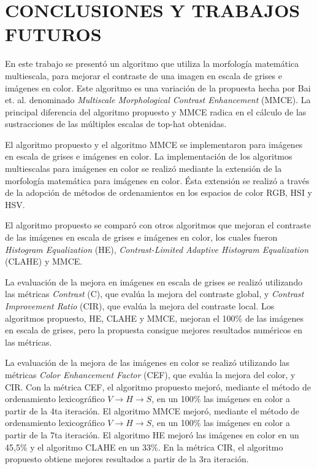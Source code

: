 \chapter{CONCLUSIONES Y TRABAJOS\\ FUTUROS}
\label{sec:conclusion}

En este trabajo se presentó un algoritmo que utiliza la morfología matemática multiescala, para mejorar el contraste de una imagen en escala de grises e imágenes en color. Este algoritmo es una variación de la propuesta hecha por Bai et. al. \cite{bai2012image} denominado \textit{Multiscale Morphological Contrast Enhancement} (MMCE). La principal diferencia del algoritmo propuesto y MMCE radica en el cálculo de las sustracciones de las múltiples escalas de top-hat obtenidas.


El algoritmo propuesto y el algoritmo MMCE se implementaron para imágenes en escala de grises e imágenes en color. La implementación de los algoritmos multiescalas para imágenes en color se realizó mediante la extensión de la morfología matemática para imágenes en color. Ésta extensión se realizó a través de la adopción de métodos de ordenamientos en los espacios de color RGB, HSI y HSV.

El algoritmo propuesto se comparó con otros algoritmos que mejoran el contraste de las imágenes en escala de grises e imágenes en color, los cuales fueron \textit{Histogram Equalization} (HE), \textit{Contrast-Limited Adaptive Histogram Equalization} (CLAHE) y MMCE. %

La evaluación de la mejora en imágenes en escala de grises se realizó utilizando las métricas \textit{Contrast} (C), que evalúa la mejora del contraste global, y \textit{Contrast Improvement Ratio} (CIR), que evalúa la mejora del contraste local. Los algoritmos propuesto, HE, CLAHE y MMCE, mejoran el 100\% de las imágenes en escala de grises, pero la propuesta consigue mejores resultados numéricos en las métricas. 

La evaluación de la mejora de las imágenes en color se realizó utilizando las métricas \textit{Color Enhancement Factor} (CEF), que evalúa la mejora del color, y CIR. Con la métrica CEF, el algoritmo propuesto mejoró, mediante el método de ordenamiento lexicográfico $V\longrightarrow H\longrightarrow S$, en un 100\% las imágenes en color a partir de la 4ta iteración. El algoritmo MMCE mejoró, mediante el método de ordenamiento lexicográfico $V\longrightarrow H\longrightarrow S$, en un 100\% las imágenes en color a partir de la 7ta iteración. El algoritmo HE mejoró las imágenes en color en un 45,5\% y el algoritmo CLAHE en un 33\%. En la métrica CIR, el algoritmo propuesto obtiene mejores resultados a partir de la 3ra iteración. 

